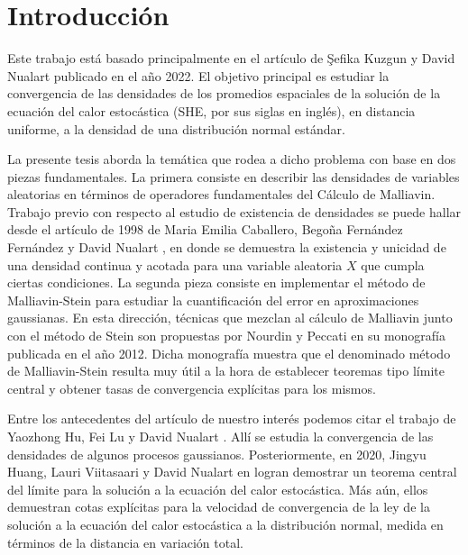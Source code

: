 \documentclass[letterpaper,twoside,12pt]{book}
\newcommand{\1}{\mathds{1}}
\theoremstyle{definition}
\theoremstyle{definition}
\theoremstyle{remark}
\theoremstyle{definition}
\theoremstyle{definition}
\theoremstyle{definition}
\theoremstyle{definition}
\theoremstyle{definition}
\begin{document}


\chapter*{Introducción}

Este trabajo está basado principalmente en el artículo de \c{S}efika Kuzgun y David Nualart \cite{KUZGUN202268} publicado en el año 2022. El objetivo principal es estudiar la convergencia de las densidades de los promedios espaciales de la solución de la ecuación del calor estocástica (SHE, por sus siglas en inglés), en distancia uniforme, a la densidad de una distribución normal estándar. 

La presente tesis aborda la temática que rodea a dicho problema con base en dos piezas fundamentales. La primera consiste en describir las densidades de variables aleatorias en términos de operadores fundamentales del Cálculo de Malliavin. Trabajo previo con respecto al estudio de existencia de densidades se puede hallar desde el artículo de 1998 de Maria Emilia Caballero, Begoña Fernández Fernández y David Nualart \cite{Caballero1998-hz}, en donde se demuestra la existencia y unicidad de una densidad continua y acotada para una variable aleatoria $X$ que cumpla ciertas condiciones. La segunda pieza consiste en  implementar el método de Malliavin-Stein para estudiar la cuantificación del error en aproximaciones gaussianas. En esta dirección, técnicas que mezclan al cálculo de Malliavin junto con el método de Stein son propuestas por Nourdin y Peccati en su monografía \cite{Nourdin_Peccati_2012} publicada en el año 2012. Dicha monografía muestra que el denominado método de Malliavin-Stein resulta muy útil a la hora de establecer teoremas tipo límite central y obtener tasas de convergencia explícitas para los mismos. 

Entre los antecedentes del artículo de nuestro interés \cite{KUZGUN202268} podemos citar el trabajo de Yaozhong Hu, Fei Lu y David Nualart \cite{HU2014814}. Allí se estudia la convergencia de las densidades de algunos procesos gaussianos. Posteriormente, en 2020, Jingyu Huang, Lauri Viitasaari y David Nualart en \cite{HUANG20207170} logran demostrar un teorema central del límite para la solución a la ecuación del calor estocástica. Más aún, ellos demuestran cotas explícitas para la velocidad de convergencia de la ley de la solución a la ecuación del calor estocástica a la distribución normal, medida en términos de la distancia en variación total. 
\end{document}

